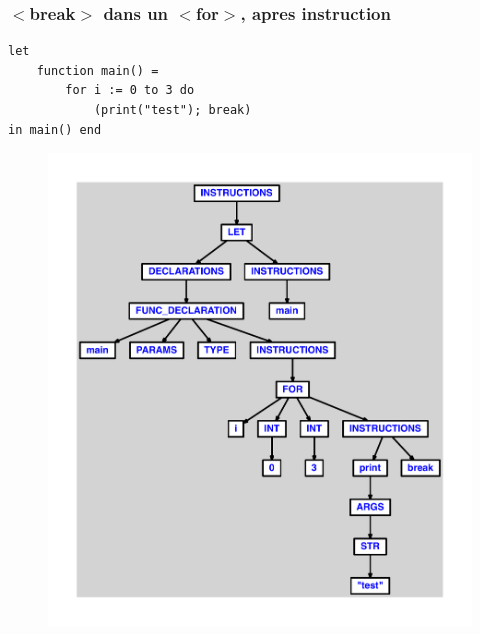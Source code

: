 \documentclass{article}
\begin{document}
\subsubsection{$ < $break$ > $ dans un $ < $for$ > $, apres instruction}
\begin{lstlisting}
let
	function main() =
		for i := 0 to 3 do
			(print("test"); break)
in main() end
\end{lstlisting}
\newpage
\begin{figure}[H]
\centering
\includegraphics[max width=\textwidth]{ast/ast_10.pdf}
\end{figure}
\newpage
\end{document}

